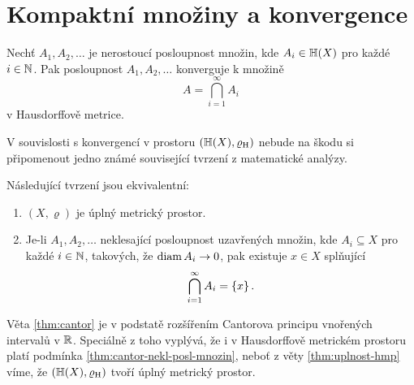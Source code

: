 \section{Kompaktní množiny a konvergence}\label{sec:konvergence-hmp}

\begin{theorem}\label{thm:konvergence-hmp}
    Nechť $A_1,A_2,\ldots$ je nerostoucí posloupnost množin, kde $A_i\in\mathbb{H}(X)$ pro každé $i\in\mathbb{N}$. Pak posloupnost $A_1,A_2,\ldots$ konverguje k množině
    \[A=\bigcap_{i=1}^\infty A_i\]
    v Hausdorffově metrice.
\end{theorem}

V souvislosti s konvergencí v prostoru $(\mathbb{H}(X),\varrho_\textup{H})$ nebude na škodu si připomenout jedno známé související tvrzení z matematické analýzy.
\begin{theorem}[Cantorova]\label{thm:cantor}
    Následující tvrzení jsou ekvivalentní:
    \begin{enumerate}[label=(\roman*)]
        \item\label{thm:cantor-uplnost} $(X,\varrho)$ je úplný metrický prostor.
        \item\label{thm:cantor-nekl-posl-mnozin} Je-li $A_1,A_2,\ldots$ neklesající posloupnost uzavřených množin, kde $A_i\subseteq X$ pro každé $i\in\mathbb{N}$, takových, že $\operatorname{diam}{A_i}\to 0$, pak existuje $x\in X$ splňující
        \[\bigcap_{i=1}^\infty A_i=\left\{x\right\}.\]
    \end{enumerate}
\end{theorem}
Věta \ref{thm:cantor} je v podstatě rozšířením Cantorova principu vnořených intervalů v $\mathbb{R}$. Speciálně z toho vyplývá, že i v Hausdorffově metrickém prostoru platí podmínka \ref{thm:cantor-nekl-posl-mnozin}, neboť z věty \ref{thm:uplnost-hmp} víme, že $(\mathbb{H}(X),\varrho_\textup{H})$ tvoří úplný metrický prostor.